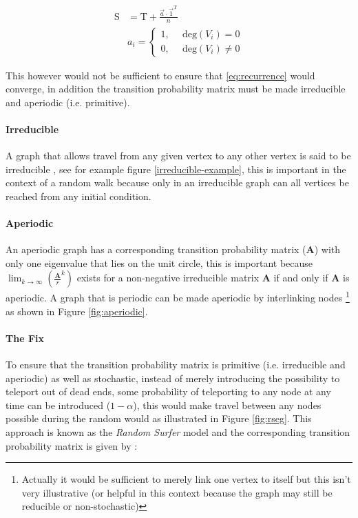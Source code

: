 \documentclass[11pt]{report}
\begin{document}
\begin{align}
\mathrm{S} &= \mathrm{T}+ \frac{\vec{a} \cdot \vec{1}^{\mathrm{T}} }{n} \label{eq:nearly-random-surfer} \\
& a_{i} = \begin{cases}
    1      , &\enspace \mathrm{deg}\left( V_{i}\right) = 0  \\
    0      , &\enspace \mathrm{deg}\left( V_{i}\right) \neq 0
\end{cases}
\end{align}

This however would not be sufficient to ensure that \eqref{eq:recurrence} would converge, in addition the transition probability matrix must be made irreducible and aperiodic (i.e. primitive). \cite{langvilleGooglePageRankScience2012}


\paragraph{Irreducible}
\label{sec:org578c303}
A graph that allows travel from any given vertex to any other vertex is said to be irreducible \cite{langvilleGooglePageRankScience2012}, see for example figure \ref{irreducible-example}, this is important in the context of a random walk because only in an irreducible graph can all vertices be reached from any initial condition.


\paragraph{Aperiodic}
\label{sec:org2c6170b}
An aperiodic graph has a corresponding transition probability matrix (\(\mathbf{A}\)) with only one eigenvalue that lies on the unit circle, this is important because \(\lim_{k\rightarrow \infty} \left( \frac{\mathbf{A}}{r}^{k} \right)\) exists for a non-negative irreducible matrix \(\mathbf{A}\) if and only if \(\mathbf{A}\) is aperiodic. A graph that is periodic can be made aperiodic by interlinking nodes \footnote{Actually it would be sufficient to merely link one vertex to itself \cite[]{langvilleGooglePageRankScience2012} but this isn't very illustrative (or helpful in this context because the graph may still be reducible or non-stochastic)} as shown in Figure \ref{fig:aperiodic}.


\paragraph{The Fix}
\label{fix}
To ensure that the transition probability matrix is primitive (i.e. irreducible
and aperiodic) as well as stochastic, instead of merely introducing the
possibility to teleport out of dead ends, some probability of teleporting to any
node at any time can be introduced (\(1- \alpha\)), this would make travel between any nodes possible during the random would as illustrated in Figure \ref{fig:rseg}. This
approach is known as the \emph{Random Surfer} model and the corresponding
transition probability matrix is given by
\cite{larrypageAnatomyLargescaleHypertextual1998} :
\end{document}
